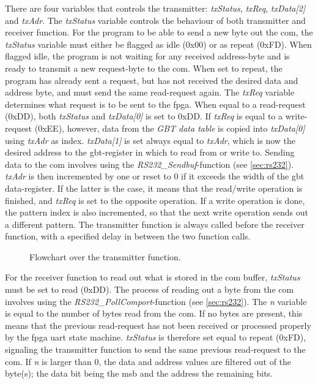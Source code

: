 \documentclass[main.tex]{subfiles}
\begin{document}
There are four variables that controls the transmitter: \textit{txStatus}, \textit{txReq}, \textit{txData[2]} and \textit{txAdr}. The \textit{txStatus} variable controls the behaviour of both transmitter and receiver function. For the program to be able to send a new byte out the \gls{com}, the \textit{txStatus} variable must either be flagged as idle (0x00) or as repeat (0xFD). When flagged idle, the program is not waiting for any received address-byte and is ready to transmit a new request-byte to the \gls{com}. When set to repeat, the program has already sent a request, but has not received the desired data and address byte, and must send the same read-request again. The \textit{txReq} variable determines what request is to be sent to the \gls{fpga}. When equal to a read-request (0xDD), both \textit{txStatus} and \textit{txData[0]} is set to 0xDD. If \textit{txReq} is equal to a write-request (0xEE), however, data from the \textit{GBT data table} is copied into \textit{txData[0]} using \textit{txAdr} as index. \textit{txData[1]} is set always equal to \textit{txAdr}, which is now the desired address to the \gls{gbt}-register in which to read from or write to. Sending data to the \gls{com} involves using the \textit{RS232\_Sendbuf}-function (see \ref{sec:rs232}). \textit{txAdr} is then incremented by one or reset to 0 if it exceeds the width of the \gls{gbt} data-register. If the latter is the case, it means that the read/write operation is finished, and \textit{txReq} is set to the opposite operation. If a write operation is done, the pattern index is also incremented, so that the next write operation sends out a different pattern. The transmitter function is always called before the receiver function, with a specified delay in between the two function calls. \\

\begin{figure}[H] %
\begin{center}
\resizebox{0.8\linewidth}{!}{}
\caption{Flowchart over the transmitter function.}
\label{fig:flowtx}
\end{center}
\end{figure}

For the receiver function to read out what is stored in the \gls{com} buffer, \textit{txStatus} must be set to read (0xDD). The process of reading out a byte from the \gls{com} involves using the \textit{RS232\_PollComport}-function (see \ref{sec:rs232}). The \textit{n} variable is equal to the number of bytes read from the \gls{com}. If no bytes are present, this means that the previous read-request has not been received or processed properly by the \gls{fpga} \gls{uart} state machine. \textit{txStatus} is therefore set equal to repeat (0xFD), signaling the transmitter function to send the same previous read-request to the \gls{com}. If \textit{n} is larger than 0, the data and address values are filtered out of the byte(s); the data bit being the \gls{msb} and the address the remaining bits.
\end{document}
